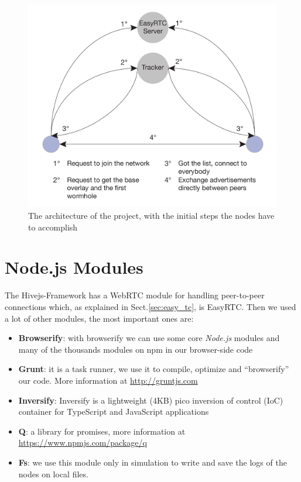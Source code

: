 \begin{figure}[ht]
  \centering
  \includegraphics[keepaspectratio=true, width=\textwidth]{images/project_architecture}\caption{The architecture of the project, with the initial steps the nodes have to accomplish}
  \label{fig:project_architecture}
\end{figure}


\section{Node.js Modules}
\label{sec:modules}
The Hivejs-Framework has a WebRTC module for handling peer-to-peer connections which, as explained in Sect.\ref{sec:easy_tc}, is EasyRTC. Then we used a lot of other modules, the most important ones are:

\begin{itemize}
	\item \textbf{Browserify}: with browserify we can use some core \textit{Node.js} modules and many of the thousands modules on npm in our browser-side code
	\item \textbf{Grunt}: it is a task runner, we use it to compile, optimize and ``browserify'' our code. More information at \url{http://gruntjs.com}
	\item \textbf{Inversify}: Inversify is a lightweight (4KB) pico inversion of control (IoC) container for TypeScript and JavaScript applications
	\item \textbf{Q}: a library for promises, more information at \url{https://www.npmjs.com/package/q}
	\item \textbf{Fs}: we use this module only in simulation to write and save the logs of the nodes on local files.
\end{itemize}


